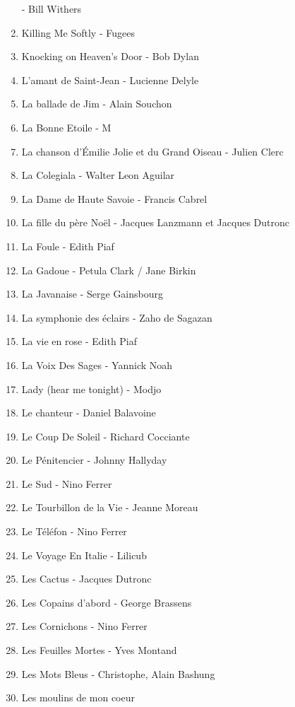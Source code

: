 \documentclass[12pt]{extarticle}
\begin{document}
\begin{multicols}{2}
\begin{enumerate}[nolistsep]
        - Bill Withers
\item   Killing Me Softly
        - Fugees
\item   Knocking on Heaven's Door
        - Bob Dylan
\item   L'amant de Saint-Jean
        - Lucienne Delyle
\item   La ballade de Jim
        - Alain Souchon
\item   La Bonne Etoile
        - M
\item   La chanson d'Émilie Jolie et du Grand Oiseau
        - Julien Clerc
\item   La Colegiala
        - Walter Leon Aguilar
\item   La Dame de Haute Savoie
        - Francis Cabrel
\item   La fille du père Noël
        - Jacques Lanzmann et Jacques Dutronc
\item   La Foule
        - Edith Piaf
\item   La Gadoue
        - Petula Clark / Jane Birkin
\item   La Javanaise
        - Serge Gainsbourg
\item   La symphonie des éclairs
        - Zaho de Sagazan
\item   La vie en rose
        - Edith Piaf
\item   La Voix Des Sages
        - Yannick Noah
\item   Lady (hear me tonight)
        - Modjo
\item   Le chanteur
        - Daniel Balavoine
\item   Le Coup De Soleil
        - Richard Cocciante
\item   Le Pénitencier
        - Johnny Hallyday
\item   Le Sud
        - Nino Ferrer
\item   Le Tourbillon de la Vie
        - Jeanne Moreau
\item   Le Téléfon
        - Nino Ferrer
\item   Le Voyage En Italie
        - Lilicub
\item   Les Cactus
        - Jacques Dutronc
\item   Les Copains d'abord
        - George Brassens
\item   Les Cornichons
        - Nino Ferrer
\item   Les Feuilles Mortes
        - Yves Montand
\item   Les Mots Bleus
        - Christophe, Alain Bashung
\item   Les moulins de mon coeur

\end{enumerate}
\end{multicols}
\end{document}
